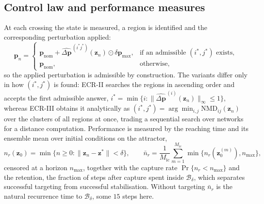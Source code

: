 \subsection{Control law and performance measures}
\label{subsec:ecr-online}

At each crossing the state is measured, a region is identified and the
corresponding perturbation applied:
%
\begin{equation}
\mathbf{p}_n=
\begin{cases}
\mathbf{p}_{\mathrm{nom}}+\widehat{\Delta\mathbf{p}}^{\,(i^{*}j^{*})}(\mathbf{z}_n)\odot\delta\mathbf{p}_{\max},
& \text{if an admissible } (i^{*},j^{*}) \text{ exists},\\
\mathbf{p}_{\mathrm{nom}}, & \text{otherwise},
\end{cases}
\label{eq:control-law}
\end{equation}
%
so the applied perturbation is admissible by construction. The variants differ
only in how $(i^{*},j^{*})$ is found: ECR-II searches the regions in ascending
order and accepts the first admissible answer,
$i^{*}=\min\{i:\|\widehat{\Delta\mathbf{p}}^{\,(i)}(\mathbf{z}_n)\|_{\infty}\le1\}$,
whereas ECR-III obtains it analytically as
$(i^{*},j^{*})=\arg\min_{i,j}\mathrm{NMD}_{ij}(\mathbf{z}_n)$ over the clusters of
all regions at once, trading a sequential search over networks for a distance
computation. Performance is measured by the reaching time and its ensemble mean
over initial conditions on the attractor,
%
\begin{equation}
n_r(\mathbf{z}_0)=\min\bigl\{n\ge0:\|\mathbf{z}_n-\mathbf{z}^{*}\|<\delta\bigr\},
\qquad
\bar{n}_r=\frac{1}{M_{\mathrm{ic}}}\sum_{m=1}^{M_{\mathrm{ic}}}
\min\bigl\{n_r(\mathbf{z}_0^{(m)}),n_{\max}\bigr\},
\label{eq:reaching-time}
\end{equation}
%
censored at a horizon $n_{\max}$, together with the capture rate
$\Pr\{n_r<n_{\max}\}$ and the retention, the fraction of steps after capture
spent inside $\mathcal{B}_\delta$, which separates successful targeting from
successful stabilisation. Without targeting $\bar{n}_r$ is the natural
recurrence time to $\mathcal{B}_\delta$, some $15$ steps here.
